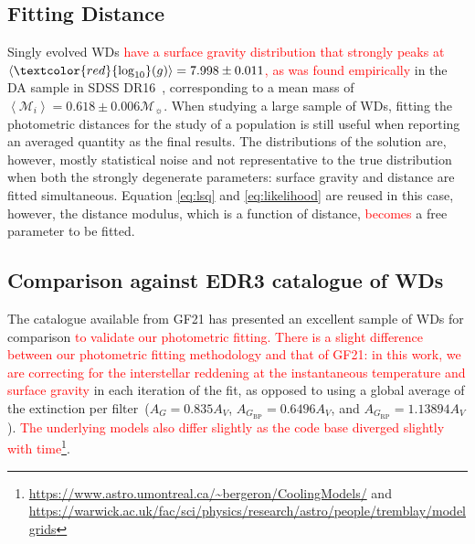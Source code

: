 \documentclass[fleqn,usenatbib]{rasti}
\newcommand{\msun}{\mathcal{M}_{\sun}}
\begin{document}
\subsection{Fitting Distance}
Singly evolved WDs \textcolor{red}{have a surface gravity distribution that
strongly peaks at $\left<\textcolor{red}{\log_{10}}(g)\right> = 7.998 \pm 0.011$,
as was found empirically} in the DA sample in SDSS DR16~\citep{2021MNRAS.507.4646K},
corresponding to a mean mass of $\left<\mathcal{M}_i\right> = 0.618 \pm 0.006 \msun$.
When studying a large sample of WDs,
fitting the photometric distances for the study of a population is still
useful when reporting an averaged quantity as the final results. The
distributions of the solution are, however, mostly statistical noise and not
representative to the true distribution when both the strongly degenerate
parameters: surface gravity and distance are fitted simultaneous. Equation
\ref{eq:lsq} and \ref{eq:likelihood} are reused in this case, however, the
distance modulus, which is a function of distance, \textcolor{red}{becomes}
a free parameter to be fitted.

\subsection{Comparison against EDR3 catalogue of WDs}
\label{sec:gf21_comparison}
The catalogue available from GF21 has presented an excellent sample of WDs for
comparison \textcolor{red}{to validate our photometric fitting. There is a
slight difference between our photometric fitting methodology and that of GF21:
in this work, we are correcting for the interstellar reddening at the
instantaneous temperature and surface gravity} in each iteration of the fit,
as opposed to using a global average of the extinction per
filter~($A_{G}=0.835A_{V}$, $A_{G_{\mathrm{BP}}}=0.6496A_{V}$, and
$A_{G_{\mathrm{RP}}}=1.13894A_{V}$). \textcolor{red}{The underlying models
also differ slightly as the code base diverged slightly with
time\footnote{\url{https://www.astro.umontreal.ca/~bergeron/CoolingModels/}
and \url{https://warwick.ac.uk/fac/sci/physics/research/astro/people/tremblay/modelgrids}}}.
\end{document}
